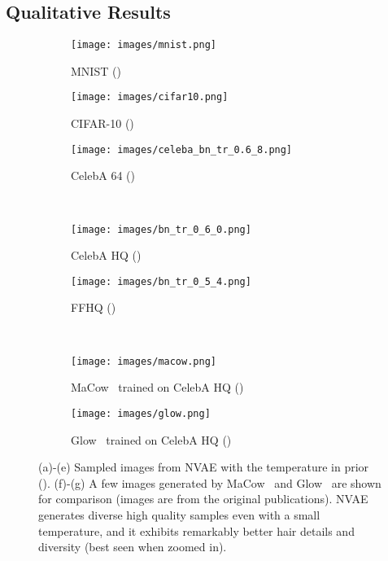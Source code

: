 \documentclass{article}
\begin{document}
\subsection{Qualitative Results}\label{sec:qual_res}
\begin{figure}[t]
\vspace{-0.5cm}
\centering
\begin{subfigure}[b]{.32\textwidth}
\centering
    \setlength{\belowcaptionskip}{1pt}
    \vspace{-0.4cm}
    \texttt{[image: images/mnist.png]}
    \caption{MNIST ()}
    \label{fig:mnist}
\end{subfigure}
\begin{subfigure}[b]{.32\textwidth}
\centering
    \setlength{\belowcaptionskip}{1pt}
    \vspace{-0.4cm}
    \texttt{[image: images/cifar10.png]}
    \caption{CIFAR-10 ()}
    \label{fig:cifar10}
\end{subfigure}
\begin{subfigure}[b]{.32\textwidth}
\centering
    \setlength{\belowcaptionskip}{1pt}
    \texttt{[image: images/celeba\_bn\_tr\_0.6\_8.png]}
    \caption{CelebA 64 ()}
    \label{fig:celeba64}
\end{subfigure} \\
\begin{subfigure}[b]{.49\textwidth}
\centering
    \setlength{\belowcaptionskip}{1pt}
    \texttt{[image: images/bn\_tr\_0\_6\_0.png]}
    \caption{CelebA HQ ()}
    \label{fig:celeba_hq}
\end{subfigure}
\begin{subfigure}[b]{.49\textwidth}
\centering
    \setlength{\belowcaptionskip}{1pt}
    \texttt{[image: images/bn\_tr\_0\_5\_4.png]}
    \caption{FFHQ ()}
    \label{fig:ffhq}
\end{subfigure} \\
\begin{subfigure}[b]{.49\textwidth}
\centering
    \setlength{\belowcaptionskip}{1pt}
    \texttt{[image: images/macow.png]}
    \caption{MaCow~\cite{ma19MaCow} trained on CelebA HQ ()}
    \label{fig:macow}
\end{subfigure}
\begin{subfigure}[b]{.49\textwidth}
\centering
    \setlength{\belowcaptionskip}{1pt}
    \texttt{[image: images/glow.png]}
    \caption{Glow~\cite{kingma2018glow} trained on CelebA HQ ()}
    \label{fig:glow}
\end{subfigure}
\caption{(a)-(e) Sampled images from NVAE with the temperature in prior (). (f)-(g) A few images generated by MaCow~\cite{ma19MaCow} and Glow~\cite{kingma2018glow} are shown for comparison (images are from the original publications). NVAE generates diverse high quality samples even with a small temperature, and it exhibits remarkably better hair details and diversity (best seen when zoomed in).}
\label{fig:main_qual}
\end{figure} 
\end{document}
